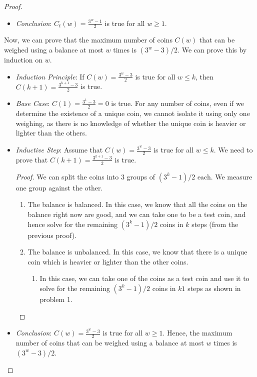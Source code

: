 \documentclass[name=Mehul\ Arora, andrewid=mehul21066, course=CSE121, num=1]{homework}
\begin{document}
\begin{proof}
\begin{itemize}[label=$\lozenge$, itemsep=2ex]
\begin{proof}
\begin{enumerate}
\begin{enumerate}
                \end{enumerate}
            \end{enumerate}
        \end{proof}
        \item \emph{Conclusion}: $C_{t}(w)=\frac{3^{w}-1}{2}$ is true for all $w\geq 1$.
    \end{itemize}
    Now, we can prove that the maximum number of coins $C(w)$ that can be weighed using a balance at most $w$ times is $(3^{w}-3)/2$. We can prove this by induction on $w$. 
    \begin{itemize}[label=$\lozenge$, itemsep=2ex]
        \item \emph{Induction Principle}: If $C(w)=\frac{3^{w}-3}{2}$ is true for all $w\leq k$, then $C(k+1)=\frac{3^{k+1}-3}{2}$ is true.
        \item \emph{Base Case}: $C(1)=\frac{3^{1}-3}{2}=0$ is true. For any number of coins, even if we determine the existence of a unique coin, we cannot isolate it using only one weighing, as there is no knowledge of whether the unique coin is heavier or lighter than the others.
        \item \emph{Inductive Step}: Assume that $C(w)=\frac{3^{w}-3}{2}$ is true for all $w\leq k$. We need to prove that $C(k+1)=\frac{3^{k+1}-3}{2}$ is true.
        \begin{proof}
            We can split the coins into 3 groups of $(3^k-1)/2$ each. We measure one group against the other.
            \begin{enumerate}
                \item The balance is balanced. In this case, we know that all the coins on the balance right now are good, and we can take one to be a test coin, and hence solve for the remaining $(3^k-1)/2$ coins in $k$ steps (from the previous proof).
                \item The balance is unbalanced. In this case, we know that there is a unique coin which is heavier or lighter than the other coins.
                \begin{enumerate}
                    \item In this case, we can take one of the coins as a test coin and use it to solve for the remaining $(3^k-1)/2$ coins in $k1$ steps as shown in problem 1.
                \end{enumerate}
            \end{enumerate}
        \end{proof}
    \item \emph{Conclusion}: $C(w)=\frac{3^{w}-3}{2}$ is true for all $w\geq 1$. Hence, the maximum number of coins that can be weighed using a balance at most $w$ times is $(3^{w}-3)/2$.

\end{itemize}
\end{proof}
\end{document}
